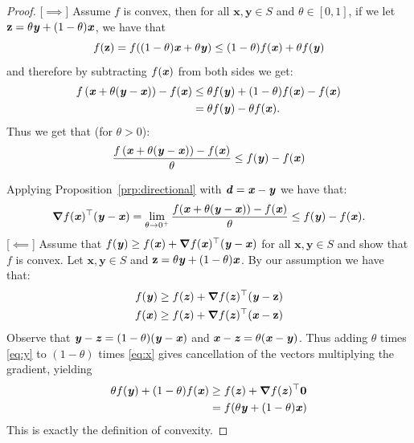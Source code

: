 \begin{proof}

  [$\implies$] Assume $f$ is convex, then for all $\mathbf{x,y} \in S$
  and $\theta \in [0,1]$, if we let $\mathbf z = \theta \yy +
  (1-\theta)\xx$, we have that
  \[
    f(\mathbf z) = f((1-\theta)\xx + \theta \yy) \leq
    (1-\theta)f(\xx) + \theta f(\yy)
    \]
    and therefore by subtracting $f(\xx)$ from both sides we get:
\begin{align*}
f\left (\xx + \theta (\yy -\xx)   \right) - f(\xx)
& \leq \theta f(\yy) + (1-\theta)f(\xx) - f(\xx) \\
  & = \theta f(\yy) - \theta f(\xx).
\end{align*}
%
%
Thus we get that (for $\theta > 0$):
$$\frac{f\left (\xx + \theta (\yy -\xx)   \right) - f(\xx)}{\theta} \leq  f(\yy) -  f(\xx)$$

Applying Proposition~\ref{prp:directional} with $\dd =\xx - \yy$ we have that: %
%
$$\grad f(\xx)^\trp (\yy-\xx) = \lim_{\theta \to 0^{+}} \frac{f(\xx + \theta (\yy - \xx)) - f(\xx)}{\theta} \leq f(\yy) - f(\xx).$$
%
[$\impliedby$] Assume that $f(\yy) \geq f(\xx) + \grad f(\xx)^\trp  (\yy-\xx)$ for all $\mathbf{x,y} \in S$ and show that $f$ is convex.  Let $\mathbf{x,y} \in S$ and $\mathbf z = \theta \yy+(1-\theta)\xx$.  By our assumption we have that:
%
\begin{align}
f(\yy) \geq f(\zz) + \grad f(\zz)^\trp (\yy - \mathbf z) \label{eq:y}  \\
f(\xx) \geq f(\zz) + \grad f(\zz)^\trp (\xx - \mathbf z) \label{eq:x}
\end{align}
%
Observe that $\yy-\zz = (1-\theta)(\yy-\xx)$ and $\xx-\zz = \theta
(\xx-\yy)$.
Thus adding
$\theta$ times \eqref{eq:y} to $(1-\theta)$ times \eqref{eq:x} gives
cancellation of the vectors multiplying the gradient, yielding
\begin{align*}
\theta f(\yy) + (1-\theta)f(\xx)  \nonumber
  & \geq  f(\zz) +  \grad f(\zz)^\trp \veczero
  \\
  & =f(\theta \yy+(1-\theta)\xx)
\end{align*}
This is exactly the definition of convexity.
\end{proof}


